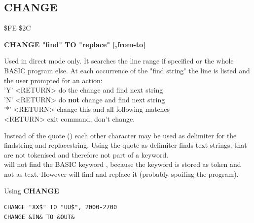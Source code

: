 \subsection{CHANGE}
\begin{description}[leftmargin=2cm,style=nextline]
\item [Token:] \$FE \$2C
\item [Format:] {\bf CHANGE "find" TO "replace" [,from-to]}
\item [Usage:]  Used
                in direct mode only. It searches the line range
                if specified or the whole BASIC program else.
                At each occurrence of the "find string" the line is
                listed and the user prompted for an action: \\
                'Y' <RETURN> do the change and find next string \\
                'N' <RETURN> do {\bf not} change and find next string \\
                '*' <RETURN> change this and all following matches \\
                    <RETURN> exit command, don't change.
                \item [Remarks:] Instead of the quote ()
                  each other character may be used
                 as delimiter for the findstring and replacestring.
                 Using the quote as delimiter finds text strings, that are
                 not tokenised and therefore not part of a keyword. \\
                  will not find
                 the BASIC keyword , because the
                 keyword is stored as token and not as text.
                 However  will
                 find and replace it (probably spoiling the program).


\item [Example:] Using {\bf CHANGE}
\begin{tcolorbox}[colback=black,coltext=white]
\verbatimfont{\codefont}
\begin{verbatim}
CHANGE "XX$" TO "UU$", 2000-2700
CHANGE &IN& TO &OUT&
\end{verbatim}
\end{tcolorbox}
\end{description}


\newpage
